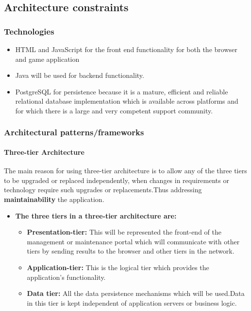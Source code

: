 \documentclass[english]{article}
\begin{document}
		\subsection{Architecture constraints}
			\subsubsection{Technologies}
			\begin{itemize}
		  \item HTML and JavaScript for the front end functionality for both the browser and game application
		  \item Java will be used for backend functionality.
		  \item PostgreSQL for persistence because it is a mature, efficient and reliable relational database
          implementation which is available across platforms and for which there is a large and very competent
         support community.
       \end{itemize}
		\subsubsection{Architectural patterns/frameworks} %
		\paragraph{Three-tier Architecture} %
		The main reason for using three-tier architecture is to allow any of the three tiers to be upgraded or    			replaced independently, when changes in requirements or technology require such upgrades or           				replacements.Thus addressing \textbf{maintainability} the application.
		
		\vspace{0.5cm}
		
		
		\begin{itemize}
			\item \textbf{The three tiers in a three-tier architecture are:}
			\begin{itemize}
		\item \textbf{Presentation-tier:} This will be represented the front-end of the management or maintenance 			portal which will communicate with other tiers by sending results to the browser and other tiers in the       		network.
		\item \textbf{Application-tier:} This is the logical tier which provides the application's functionality.	
		\item \textbf{Data tier:} All the data persistence mechanisms which will be used.Data in this tier is kept independent of application servers or business logic. 	
	  \end{itemize}
				\end{itemize}
\end{document}
